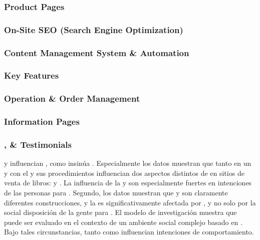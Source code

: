\subsubsection{Product Pages}

\subsubsection{On-Site SEO (Search Engine Optimization)}

\subsubsection{Content Management System \& Automation}

\subsubsection{Key \ecommerce Features}

\subsubsection{Operation \& Order Management}

\subsubsection{Information Pages}


\subsubsection{\security, \trust \& Testimonials}

\trust y \familiarity influencian \ecommerce, como insinúa \luhmanntheory. Especialmente los datos muestran que tanto \trust en un \consumer \internet y \familiarity con el \seller y sus procedimientos influencian dos aspectos distintos de \ecommerce en sitios de venta de libros: \inquiry y \purchase. La influencia de la  \familiarity y \trust son especialmente fuertes en intenciones  de las personas para \purchase. Segundo, los datos muestran que \trust y \familiarity son claramente diferentes construcciones, y la \trust es significativamente afectada por \familiarity, y no solo por la social disposición de la gente para \trust. El modelo de investigación muestra que  \ecommerce puede ser evaluado en el contexto de un ambiente social complejo basado en \luhmanntheory. Bajo tales circunstancias, tanto \trust como \familiarity influencian intenciones de comportamiento\cite{gefen2000commerce}.

